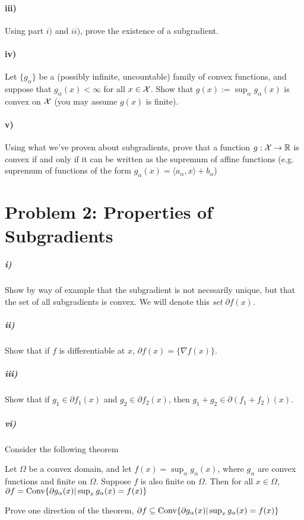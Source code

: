 \documentclass[12pt]{article}
\begin{document}
\paragraph{iii)} Using part $i)$ and $ii)$, prove the existence of a subgradient. 

\paragraph{iv)} Let $\{g_{\alpha}\}$ be a (possibly infinite, uncountable) family of convex functions, and suppose that $g_{\alpha}(x) < \infty$ for all $x \in {\cal X}$. Show that $g(x) := \sup_{\alpha} g_{\alpha}(x)$ is convex on ${\cal X}$ (you may assume $g(x)$ is finite).

\paragraph{v)} Using what we've proven about subgradients, prove that a function $g: {\cal X} \to \mathbb{R}$ is convex if and only if it can be written as the supremum of affine functions (e.g. supremum of functions of the form $g_{\alpha}(x) = \langle a_{\alpha}, x \rangle + b_{\alpha}$)

\section*{Problem 2: Properties of Subgradients}

\subparagraph{i)} Show by way of example that the subgradient is not necssarily unique, but that the set of all subgradients is convex. We will denote this \emph{set} $\partial f(x)$.

\subparagraph{ii)} Show that if $f$ is differentiable at $x$, $\partial f(x) = \{\nabla f(x)\}$. 

\subparagraph{iii)} Show that if $g_1 \in \partial f_1(x)$ and $g_2 \in \partial f_2(x)$, then $g_1 + g_2 \in \partial(f_1 + f_2)(x)$. 



\subparagraph{vi)} Consider the following theorem
\begin{theorem*}\label{thm:smthm} Let $\Omega$ be a convex domain, and let $f(x) = \sup_{\alpha} g_{\alpha}(x)$, where $g_{\alpha}$ are convex functions and finite on $\Omega$. Suppose $f$ is also finite on $\Omega$. Then for all $x \in \Omega$, $\partial f = \mathrm{Conv} \{\partial g_{\alpha}(x) | \sup_{x} g_{\alpha}(x) =f(x) \}$
\end{theorem*}
Prove one direction of the theorem, $\partial f \subseteq \mathrm{Conv} \{\partial g_{\alpha}(x) | \sup_{x} g_{\alpha}(x) =f(x) \}$
\end{document}
